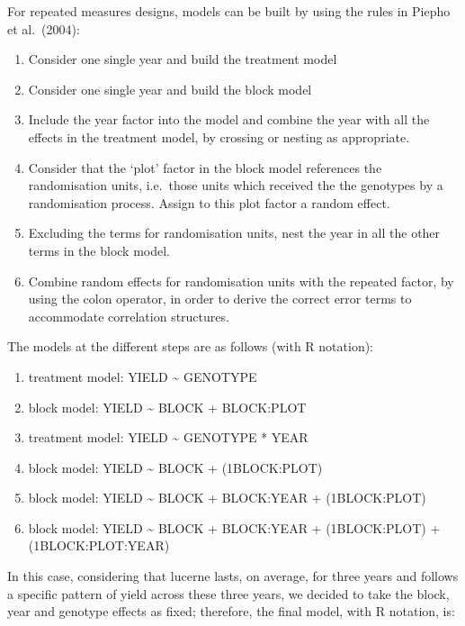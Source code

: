 \documentclass[a4paper,12pt,oneside]{book}
\providecommand{\tightlist}{%
  \setlength{\itemsep}{0pt}\setlength{\parskip}{0pt}}
\begin{document}
For repeated measures designs, models can be built by using the rules in Piepho et al.~(2004):

\begin{enumerate}
\def\labelenumi{\arabic{enumi}.}
\tightlist
\item
  Consider one single year and build the treatment model
\item
  Consider one single year and build the block model
\item
  Include the year factor into the model and combine the year with all the effects in the treatment model, by crossing or nesting as appropriate.
\item
  Consider that the `plot' factor in the block model references the randomisation units, i.e.~those units which received the the genotypes by a randomisation process. Assign to this plot factor a random effect.
\item
  Excluding the terms for randomisation units, nest the year in all the other terms in the block model.
\item
  Combine random effects for randomisation units with the repeated factor, by using the colon operator, in order to derive the correct error terms to accommodate correlation structures.
\end{enumerate}

The models at the different steps are as follows (with R notation):

\begin{enumerate}
\def\labelenumi{\arabic{enumi}.}
\tightlist
\item
  treatment model: YIELD \textasciitilde{} GENOTYPE
\item
  block model: YIELD \textasciitilde{} BLOCK + BLOCK:PLOT
\item
  treatment model: YIELD \textasciitilde{} GENOTYPE * YEAR
\item
  block model: YIELD \textasciitilde{} BLOCK + (1\textbar BLOCK:PLOT)
\item
  block model: YIELD \textasciitilde{} BLOCK + BLOCK:YEAR + (1\textbar BLOCK:PLOT)
\item
  block model: YIELD \textasciitilde{} BLOCK + BLOCK:YEAR + (1\textbar BLOCK:PLOT) + (1\textbar BLOCK:PLOT:YEAR)
\end{enumerate}

In this case, considering that lucerne lasts, on average, for three years and follows a specific pattern of yield across these three years, we decided to take the block, year and genotype effects as fixed; therefore, the final model, with R notation, is:
\end{document}
